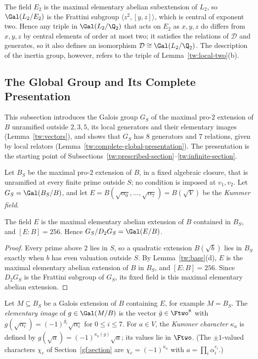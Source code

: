 \begin{remark}\label{tw:triple-remark}
The field $E_2$ is the maximal elementary abelian subextension of $L_2$, so
$\Gal(L_2/E_2)$ is the Frattini subgroup $\langle z^2,[y,z]\rangle$, which is
central of exponent two. Hence any triple in $\Gal(L_2/\Q_2)$ that acts on
$E_2$ as $x,y,z$ do differs from $x,y,z$ by central elements of order at
most two; it satisfies the relations of $\mathcal D$ and generates, so it also
defines an isomorphism $\mathcal D\cong\Gal(L_2/\Q_2)$. The description of the
inertia group, however, refers to the triple of
Lemma~\ref{tw:local-two}(b).
\end{remark}

\subsection{The Global Group and Its Complete Presentation}\label{tw:global-section}
This subsection introduces the Galois group $G_S$ of the maximal pro-$2$
extension of $B$ unramified outside $2,3,5$, its local generators and their
elementary images (Lemma~\ref{tw:vectors}), and shows that $G_S$ has $8$
generators and $7$ relations, given by local relators
(Lemma~\ref{tw:complete-global-presentation}). The presentation is the
starting point of Subsections~\ref{tw:prescribed-section}--\ref{tw:infinite-section}.

Let $B_S$ be the maximal pro-$2$ extension of $B$, in a fixed algebraic
closure, that is unramified at every finite prime outside $S$; no condition
is imposed at $v_1,v_2$. Let $G_S=\Gal(B_S/B)$, and let
$E=B(\sqrt{\alpha_0},\dots,\sqrt{\alpha_7})=B(\sqrt V)$ be the
\emph{Kummer field}.

\begin{lemma}\label{tw:kummer-field}
The field $E$ is the maximal elementary abelian extension of $B$ contained in
$B_S$, and $[E:B]=256$. Hence $G_S/D_2G_S=\Gal(E/B)$.
\end{lemma}

\begin{proof}
Every prime above $2$ lies in $S$, so a quadratic extension $B(\sqrt b)$ lies
in $B_S$ exactly when $b$ has even valuation outside $S$. By
Lemma~\ref{tw:base}(d), $E$ is the maximal elementary abelian extension of
$B$ in $B_S$, and $[E:B]=256$. Since $D_2G_S$ is the Frattini subgroup of
$G_S$, its fixed field is this maximal elementary abelian extension.
\end{proof}

\begin{definition}\label{tw:elementary-image}
Let $M\subseteq B_S$ be a Galois extension of $B$ containing $E$, for
example $M=B_S$. The \emph{elementary image} of $g\in\Gal(M/B)$ is the vector
$\bar g\in\Ftwo^8$ with $g(\sqrt{\alpha_i})=(-1)^{\bar g_i}\sqrt{\alpha_i}$ for
$0\le i\le7$. For $a\in V$, the \emph{Kummer character} $\kappa_a$ is defined by
$g(\sqrt a)=(-1)^{\kappa_a(g)}\sqrt a$; its values lie in $\Ftwo$. (The
$\pm1$-valued characters $\chi_e$ of Section~\ref{gf:section} are
$\chi_e=(-1)^{\kappa_{a}}$ with $a=\prod_i\alpha_i^{e_i}$.)
\end{definition}

